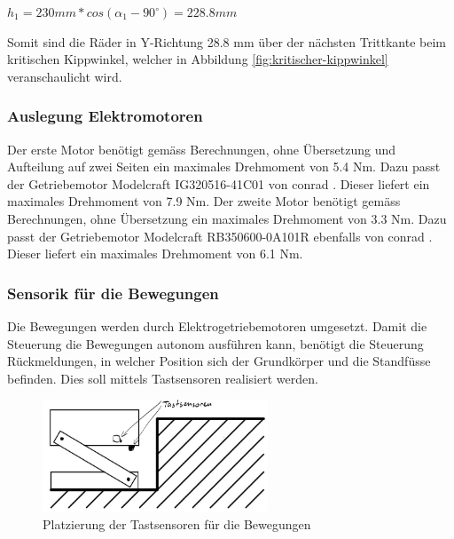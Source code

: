 \(h_{1} = 230 mm * cos(\alpha_{1} - 90^\circ) = 228.8 mm\)

Somit sind die Räder in Y-Richtung 28.8 mm über der nächsten Trittkante beim kritischen Kippwinkel, welcher in Abbildung \ref{fig:kritischer-kippwinkel} veranschaulicht wird.\\


\newpage
\subsubsection{Auslegung Elektromotoren}
Der erste Motor benötigt gemäss Berechnungen, ohne Übersetzung und Aufteilung auf zwei Seiten  ein maximales Drehmoment von 5.4 Nm. Dazu passt der Getriebemotor Modelcraft IG320516-41C01 von conrad \cite{Getriebemotor1}. Dieser liefert ein maximales Drehmoment von 7.9 Nm. 
Der zweite Motor benötigt gemäss Berechnungen, ohne Übersetzung ein maximales Drehmoment von 3.3 Nm. Dazu passt der Getriebemotor Modelcraft RB350600-0A101R ebenfalls von conrad \cite{Getriebemotor2}. Dieser liefert ein maximales Drehmoment von 6.1 Nm.

\subsubsection{Sensorik für die Bewegungen}
Die Bewegungen werden durch Elektrogetriebemotoren umgesetzt. Damit die Steuerung die Bewegungen autonom ausführen kann, benötigt die Steuerung Rückmeldungen, in welcher Position sich der Grundkörper und die Standfüsse befinden. Dies soll mittels Tastsensoren realisiert werden.

\begin{figure}[h]
  \includegraphics[width=0.6\textwidth]{img/Treppensteigen/Sensoren_Treppensteigen2.png}
  \centering
  \caption{Platzierung der Tastsensoren für die Bewegungen}
  \label{fig:sensoren-treppensteigen2}
\end{figure}

